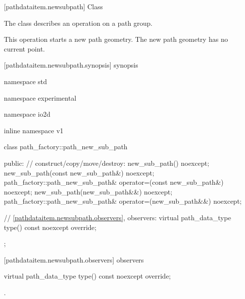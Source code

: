  [pathdataitem.newsubpath] {Class }

\pnum
{}
The class  describes an operation on a path group.

\pnum
This operation starts a new path geometry. The new path geometry has no current point.

 [pathdataitem.newsubpath.synopsis] { synopsis}

\begin{codeblock}
namespace std { namespace experimental { namespace io2d { inline namespace v1 {
  class path_factory::path_new_sub_path {
  public:
    // construct/copy/move/destroy:
    new_sub_path() noexcept;
    new_sub_path(const new_sub_path&) noexcept;
    path_factory::path_new_sub_path& operator=(const new_sub_path&) noexcept;
    new_sub_path(new_sub_path&&) noexcept;
    path_factory::path_new_sub_path& operator=(new_sub_path&&) noexcept;

    // \ref{pathdataitem.newsubpath.observers}, observers:
    virtual path_data_type type() const noexcept override;
  };
} } } }
\end{codeblock}

 [pathdataitem.newsubpath.observers]{ observers}

\begin{itemdecl}
    virtual path_data_type type() const noexcept override;
\end{itemdecl}
\begin{itemdescr}
	\pnum
	\returns
	.

\end{itemdescr}
